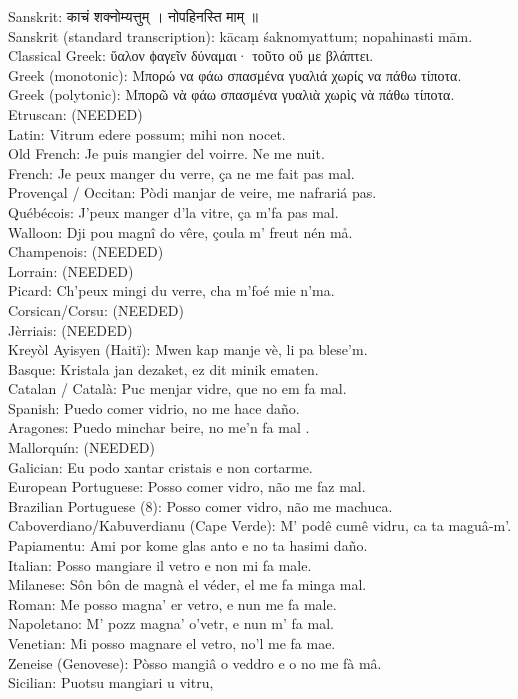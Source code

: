\documentclass{report}
\begin{document}
Sanskrit: ﻿काचं शक्नोम्यत्तुम् । नोपहिनस्ति माम् ॥\\{} Sanskrit (standard transcription): kācaṃ śaknomyattum; nopahinasti mām.\\{} Classical Greek: ὕαλον ϕαγεῖν δύναμαι· τοῦτο οὔ με βλάπτει.\\{} Greek (monotonic): Μπορώ να φάω σπασμένα γυαλιά χωρίς να πάθω τίποτα.\\{} Greek (polytonic): Μπορῶ νὰ φάω σπασμένα γυαλιὰ χωρὶς νὰ πάθω τίποτα.\\{} Etruscan: (NEEDED)\\{} Latin: Vitrum edere possum; mihi non nocet.\\{} Old French: Je puis mangier del voirre. Ne me nuit.\\{} French: Je peux manger du verre, ça ne me fait pas mal.\\{} Provençal / Occitan: Pòdi manjar de veire, me nafrariá pas.\\{} Québécois: J'peux manger d'la vitre, ça m'fa pas mal.\\{} Walloon: Dji pou magnî do vêre, çoula m' freut nén må.\\{} Champenois: (NEEDED)\\{} Lorrain: (NEEDED)\\{} Picard: Ch'peux mingi du verre, cha m'foé mie n'ma.\\{} Corsican/Corsu: (NEEDED)\\{} Jèrriais: (NEEDED)\\{} Kreyòl Ayisyen (Haitï): Mwen kap manje vè, li pa blese'm.\\{} Basque: Kristala jan dezaket, ez dit minik ematen.\\{} Catalan / Català: Puc menjar vidre, que no em fa mal.\\{} Spanish: Puedo comer vidrio, no me hace daño.\\{} Aragones: Puedo minchar beire, no me'n fa mal .\\{} Mallorquín: (NEEDED)\\{} Galician: Eu podo xantar cristais e non cortarme.\\{} European Portuguese: Posso comer vidro, não me faz mal.\\{} Brazilian Portuguese (8): Posso comer vidro, não me machuca.\\{} Caboverdiano/Kabuverdianu (Cape Verde): M' podê cumê vidru, ca ta maguâ{-}m'.\\{} Papiamentu: Ami por kome glas anto e no ta hasimi daño.\\{} Italian: Posso mangiare il vetro e non mi fa male.\\{} Milanese: Sôn bôn de magnà el véder, el me fa minga mal.\\{} Roman: Me posso magna' er vetro, e nun me fa male.\\{} Napoletano: M' pozz magna' o'vetr, e nun m' fa mal.\\{} Venetian: Mi posso magnare el vetro, no'l me fa mae.\\{} Zeneise (Genovese): Pòsso mangiâ o veddro e o no me fà mâ.\\{} Sicilian: Puotsu mangiari u vitru, 
\end{document}
